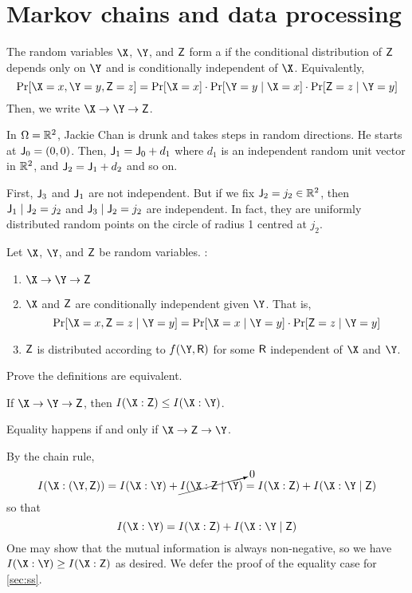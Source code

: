 \documentclass[class=co432,notes,tikz]{agony}
\begin{document}
\section{Markov chains and data processing}
\begin{defn}
  The random variables $\X$, $\Y$, and $\mathsf Z$ form a 
  if the conditional distribution of $\mathsf Z$ depends only on $\Y$
  and is conditionally independent of $\X$. Equivalently,
  \[ \Pr[\X=x,\Y=y,\rv Z=z] = \Pr[\X=x]\cdot\Pr[\Y=y\mid\X=x]\cdot\Pr[\rv Z=z\mid\Y=y] \]
  Then, we write $\X \to \Y \to \rv Z$.
\end{defn}

\begin{example}
  In $\Omega = \mathbb{R}^2$, Jackie Chan is drunk and takes steps in random directions.
  He starts at $\mathsf J_0 = (0,0)$.
  Then, $\mathsf J_1 = \mathsf J_0 + d_1$ where $d_1$ is an independent random unit vector in $\mathbb{R}^2$,
  and $\mathsf J_2 = \mathsf J_1 + d_2$ and so on.
\end{example}

First, $\mathsf J_3$ and $\mathsf J_1$ are not independent.
But if we fix $\mathsf J_2 = j_2 \in \mathbb{R}^2$, then $\mathsf J_1 \mid \mathsf J_2=j_2$
and $\mathsf J_3 \mid \mathsf J_2=j_2$ are independent.
In fact, they are uniformly distributed random points on the circle of radius 1
centred at $j_2$.

\begin{prop}\label{prop:markov}
  Let $\X$, $\Y$, and $\mathsf Z$ be random variables. \TFAE:
  \begin{enumerate}
    \item $\X \to \Y \to \rv Z$
    \item $\X$ and $\mathsf Z$ are conditionally independent given $\Y$.
          That is,
          \[
            \Pr[\X=x,\rv Z=z \mid \Y=y] = \Pr[\X=x \mid \Y=y] \cdot \Pr[\rv Z=z \mid \Y=y]
          \]
    \item $\mathsf Z$ is distributed according to $f(\Y,\rv R)$ for some $\mathsf R$ independent of $\X$ and $\Y$.
  \end{enumerate}
\end{prop}
\begin{xca}
  Prove the definitions are equivalent.
\end{xca}

\begin{theorem}\label{thm:dpi}
  If $\X \to \Y \to \rv Z$, then $I(\X : \rv Z) \leq I(\X : \Y)$.

  Equality happens if and only if $\X \to \rv Z \to \Y$.
\end{theorem}
\begin{prf}
  By the chain rule,
  \[
    I(\X : (\Y, \rv Z)) = I(\X : \Y) + \cancelto{0}{I(\X : \rv Z \mid \Y)}
    = I(\X : \rv Z) + I(\X : \Y \mid \rv Z)
  \]
  so that
  \[ I(\X : \Y) = I(\X : \rv Z) + I(\X : \Y \mid \rv Z) \]
  One may show that the mutual information is always non-negative,
  so we have $I(\X : \Y) \geq I(\X : \rv Z)$ as desired.
  We defer the proof of the equality case for \cref{sec:ss}.
\end{prf}
\end{document}
